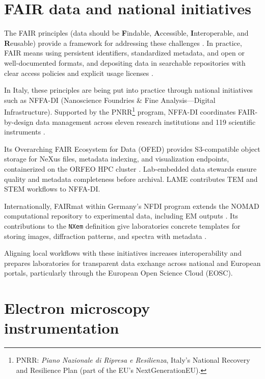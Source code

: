 \section{FAIR data and national initiatives}\label{sec:nffa-di}

The FAIR principles (data should be \textbf{F}indable, \textbf{A}ccessible, \textbf{I}nteroperable, and \textbf{R}eusable) provide a framework for addressing these challenges \parencite{Wilkinson2016FAIR,GOFAIRPrinciples}. 
In practice, FAIR means using persistent identifiers, standardized metadata, and open or well-documented formats, and depositing data in searchable repositories with clear access policies and explicit usage licenses \parencite{EC2018TurningFAIR,EC2021HEGuide}. 

In Italy, these principles are being put into practice through national initiatives such as NFFA-DI (Nanoscience Foundries \& Fine Analysis—Digital Infrastructure). Supported by the PNRR\footnote{PNRR: \emph{Piano Nazionale di Ripresa e Resilienza}, Italy’s National Recovery and Resilience Plan (part of the EU’s NextGenerationEU).} program, NFFA-DI coordinates FAIR-by-design data management across eleven research institutions and 119 scientific instruments \parencite{nffamaster2024}.

Its Overarching FAIR Ecosystem for Data (OFED) provides S3-compatible object storage for NeXus files, metadata indexing, and visualization endpoints, containerized on the ORFEO HPC cluster \parencite{ofedslides}. 
Lab-embedded data stewards ensure quality and metadata completeness before archival. 
LAME contributes TEM and STEM workflows to NFFA-DI.

Internationally, FAIRmat within Germany’s NFDI program extends the NOMAD computational repository to experimental data, including EM outputs \parencite{fairmatPortal}. 
Its contributions to the \texttt{NXem} definition give laboratories concrete templates for storing images, diffraction patterns, and spectra with metadata \parencite{fairmathdf5}. 

Aligning local workflows with these initiatives increases interoperability and prepares laboratories for transparent data exchange across national and European portals, particularly through the European Open Science Cloud (EOSC). 


\section{Electron microscopy instrumentation}

